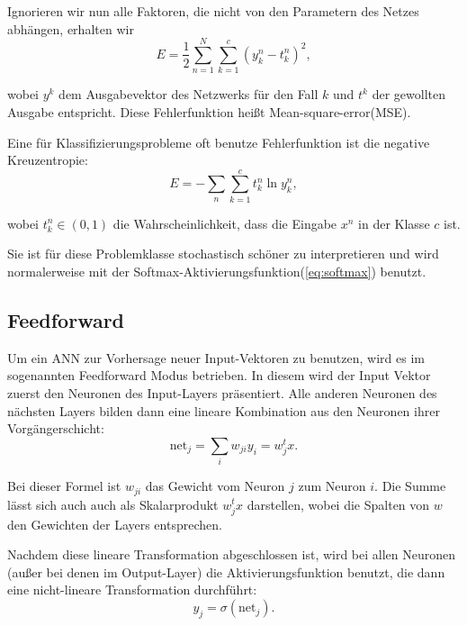 Ignorieren wir nun alle Faktoren, die nicht von den Parametern des Netzes abhängen, erhalten wir 
\begin{equation}
\label{eq:MSE}
E = \frac{1}{2} \sum_{n=1}^N \sum_{k=1}^c \left( y_k^n - t_k^n \right)^2,
\end{equation}

wobei $y^k$ dem Ausgabevektor des Netzwerks für den Fall $k$ und $t^k$ der gewollten Ausgabe entspricht.
Diese Fehlerfunktion heißt Mean-square-error(MSE)\cite{bishop1995neural}.

Eine für Klassifizierungsprobleme oft benutze Fehlerfunktion ist die negative Kreuzentropie:
\begin{equation}
\label{eq:crossEntropy}
    E = -\sum_{n} \sum_{k=1}^c t_k^n \ln y_k^n ,
\end{equation}

wobei $t_k^n \in (0,1)$ die Wahrscheinlichkeit, dass die Eingabe $x^n$ in der Klasse $c$ ist. 

Sie ist für diese Problemklasse stochastisch schöner zu interpretieren und wird normalerweise mit der Softmax-Aktivierungsfunktion(\ref{eq:softmax}) benutzt\cite{bishop1995neural}.

\subsection{Feedforward}
Um ein ANN zur Vorhersage neuer Input-Vektoren zu benutzen, wird es im sogenannten Feedforward Modus betrieben. In diesem wird der Input Vektor zuerst den Neuronen des Input-Layers präsentiert. Alle anderen Neuronen des nächsten Layers bilden dann eine lineare Kombination aus den Neuronen ihrer Vorgängerschicht: 
\begin{equation}
\label{eq:feedforward1}
\text{net}_j = \sum_{i} w_{ji} y_i = w_j^t x.
\end{equation}

Bei dieser Formel ist $w_{ji}$ das Gewicht vom Neuron $j$ zum Neuron $i$. Die Summe lässt sich auch auch als Skalarprodukt $w_j^t x$ darstellen, wobei die Spalten von $w$ den Gewichten der Layers entsprechen. %

Nachdem diese lineare Transformation abgeschlossen ist, wird bei allen Neuronen (außer bei denen im Output-Layer) die Aktivierungsfunktion benutzt, die dann eine nicht-lineare Transformation durchführt: 
\begin{equation}
\label{eq:feedforward2}
y_j = \sigma (\text{net}_j).
\end{equation}

